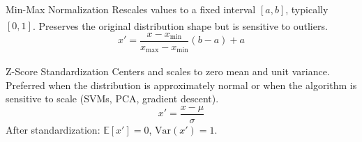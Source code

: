 \begin{v3topic}{Min-Max Normalization}
    Rescales values to a fixed interval $[a, b]$, typically $[0, 1]$\textsuperscript{\cite{hanDataMiningConcepts2012}}.
    Preserves the original distribution shape but is sensitive to outliers.
    \begin{equation}
        x' = \frac{x - x_{\min}}{x_{\max} - x_{\min}}(b - a) + a
    \end{equation}

\end{v3topic}
\begin{v3topic}{Z-Score Standardization}
    Centers and scales to zero mean and unit variance\textsuperscript{\cite{hanDataMiningConcepts2012}}.
    Preferred when the distribution is approximately normal or when the algorithm is sensitive to scale (SVMs, PCA, gradient descent).
    \begin{equation}
        x' = \frac{x - \mu}{\sigma}
    \end{equation}
    After standardization: $\mathbb{E}[x'] = 0$, $\mathrm{Var}(x') = 1$.

\end{v3topic}
